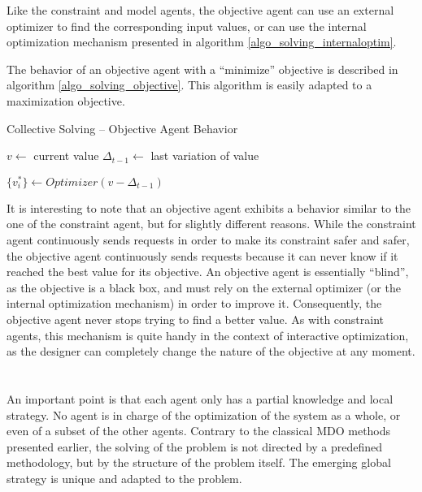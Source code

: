 Like the constraint and model agents, the objective agent can use an external optimizer to find the corresponding input values, or can use the internal optimization mechanism presented in algorithm \ref{algo_solving_internaloptim}.

The behavior of an objective agent with a \enquote{minimize} objective is described in algorithm \ref{algo_solving_objective}. This algorithm is easily adapted to a maximization objective.

\begin{algorithm}
\caption{Collective Solving -- Objective Agent Behavior}
\label{algo_solving_objective}

$v \leftarrow $ current value\;
$\Delta_{t-1} \leftarrow $ last variation of value \;

\BlankLine
$\{v_i^* \} \leftarrow Optimizer(v - \Delta_{t-1})$\;
	
\end{algorithm}

It is interesting to note that an objective agent exhibits a behavior similar to the one of the constraint agent, but for slightly different reasons. While the constraint agent continuously sends requests in order to make its constraint safer and safer, the objective agent continuously sends requests because it can never know if it reached the best value for its objective. An objective agent is essentially \enquote{blind}, as the objective is a black box, and must rely on the external optimizer (or the internal optimization mechanism) in order to improve it. Consequently, the objective agent never stops trying to find a better value. As with constraint agents, this mechanism is quite handy in the context of interactive optimization, as the designer can completely change the nature of the objective at any moment.
\\\\\\
An important point is that each agent only has a partial knowledge and local strategy. No agent is in charge of the optimization of the system as a whole, or even of a subset of the other agents. Contrary to the classical MDO methods presented earlier, the solving of the problem is not directed by a predefined methodology, but by the structure of the problem itself. The emerging global strategy is unique and adapted to the problem.

